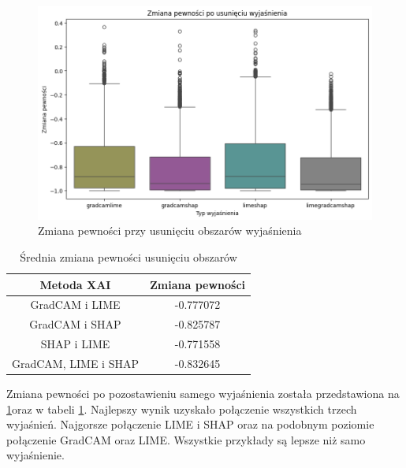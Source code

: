 \begin{figure}[h]
	\centering\includegraphics[width=.9\textwidth]{img/combine_confidence_no_exp_or}
	\caption{Zmiana pewności przy usunięciu obszarów wyjaśnienia}  \label{rys:combineandconfidenceorno}
\end{figure}
\begin{table}[h]
	\centering
	\begin{tabular}{|c|c|}
		\hline
		\textbf{Metoda XAI}  & Zmiana pewności \\
		\hline
		GradCAM i LIME       & -0.777072       \\
		\hline
		GradCAM i SHAP       & -0.825787       \\
		\hline
		SHAP i LIME          & -0.771558       \\
		\hline
		GradCAM, LIME i SHAP & -0.832645       \\
		\hline
	\end{tabular}
	\caption{Średnia zmiana pewności usunięciu obszarów}
	\label{tab:combineandconfidenceorno}
\end{table}
Zmiana pewności po pozostawieniu samego wyjaśnienia została przedstawiona na \ref{rys:combineandconfidenceorno}oraz w tabeli \ref{tab:combineandconfidenceorno}.
Najlepszy wynik uzyskało połączenie wszystkich trzech wyjaśnień.
Najgorsze połączenie LIME i SHAP oraz na podobnym poziomie połączenie GradCAM oraz LIME.
Wszystkie przykłady są lepsze niż samo wyjaśnienie.
